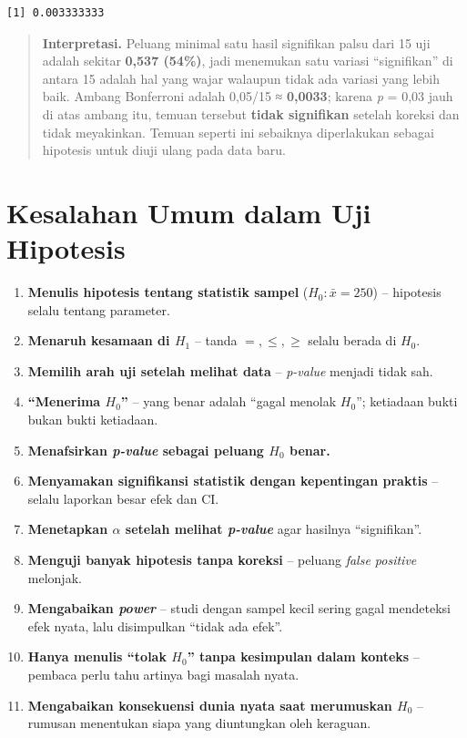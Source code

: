 \documentclass[
  indonesian,
  letterpaper,
]{book}
\providecommand{\tightlist}{%
  \setlength{\itemsep}{0pt}\setlength{\parskip}{0pt}}
\begin{document}
\begin{verbatim}
[1] 0.003333333
\end{verbatim}

\begin{quote}
\textbf{Interpretasi.} Peluang minimal satu hasil signifikan palsu dari
15 uji adalah sekitar \textbf{0,537 (54\%)}, jadi menemukan satu variasi
``signifikan'' di antara 15 adalah hal yang wajar walaupun tidak ada
variasi yang lebih baik. Ambang Bonferroni adalah 0,05/15 ≈
\textbf{0,0033}; karena \emph{p} = 0,03 jauh di atas ambang itu, temuan
tersebut \textbf{tidak signifikan} setelah koreksi dan tidak meyakinkan.
Temuan seperti ini sebaiknya diperlakukan sebagai hipotesis untuk diuji
ulang pada data baru.
\end{quote}

\section{Kesalahan Umum dalam Uji
Hipotesis}\label{kesalahan-umum-dalam-uji-hipotesis}

\begin{enumerate}
\def\labelenumi{\arabic{enumi}.}
\tightlist
\item
  \textbf{Menulis hipotesis tentang statistik sampel}
  (\(H_0: \bar{x} = 250\)) -- hipotesis selalu tentang parameter.
\item
  \textbf{Menaruh kesamaan di \(H_1\)} -- tanda \(=, \le, \ge\) selalu
  berada di \(H_0\).
\item
  \textbf{Memilih arah uji setelah melihat data} -- \emph{p-value}
  menjadi tidak sah.
\item
  \textbf{``Menerima \(H_0\)''} -- yang benar adalah ``gagal menolak
  \(H_0\)''; ketiadaan bukti bukan bukti ketiadaan.
\item
  \textbf{Menafsirkan \emph{p-value} sebagai peluang \(H_0\) benar.}
\item
  \textbf{Menyamakan signifikansi statistik dengan kepentingan praktis}
  -- selalu laporkan besar efek dan CI.
\item
  \textbf{Menetapkan \(\alpha\) setelah melihat \emph{p-value}} agar
  hasilnya ``signifikan''.
\item
  \textbf{Menguji banyak hipotesis tanpa koreksi} -- peluang \emph{false
  positive} melonjak.
\item
  \textbf{Mengabaikan \emph{power}} -- studi dengan sampel kecil sering
  gagal mendeteksi efek nyata, lalu disimpulkan ``tidak ada efek''.
\item
  \textbf{Hanya menulis ``tolak \(H_0\)'' tanpa kesimpulan dalam
  konteks} -- pembaca perlu tahu artinya bagi masalah nyata.
\item
  \textbf{Mengabaikan konsekuensi dunia nyata saat merumuskan \(H_0\)}
  -- rumusan menentukan siapa yang diuntungkan oleh keraguan.
\end{enumerate}
\end{document}
